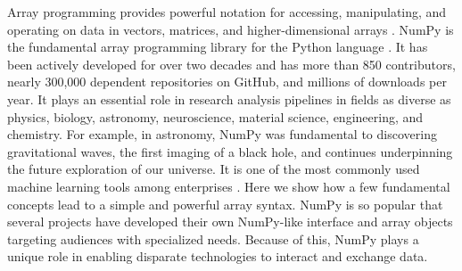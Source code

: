 




Array programming provides powerful notation for accessing,
manipulating, and operating on data in vectors, matrices, and
higher-dimensional arrays \cite{iverson1980notation}.
NumPy is the fundamental array programming library for the Python language
\cite{dubois2007guest,oliphant2007python,millman2011python,perez2011python}.
It has been actively developed for over two decades and has more than 850
contributors, nearly 300,000 dependent repositories on GitHub, and millions of
downloads per year.
It plays an essential role in research analysis pipelines in fields as
diverse as physics, biology, astronomy, neuroscience, material science,
engineering, and chemistry.
For example, in astronomy, NumPy was fundamental to discovering gravitational
waves\cite{pycbc}, the first imaging of a black hole\cite{eht-imaging}, and
continues underpinning the future exploration of our
universe\cite{jenness2018lsst}.
It is one of the most commonly used machine learning tools among
enterprises \cite{451report2018}.
Here we show how a few fundamental concepts lead to a simple and powerful array syntax.
NumPy is so popular that several projects have developed their own
NumPy-like interface and array objects targeting audiences with specialized
needs.
Because of this, NumPy plays a unique role in enabling disparate technologies
to interact and exchange data.
